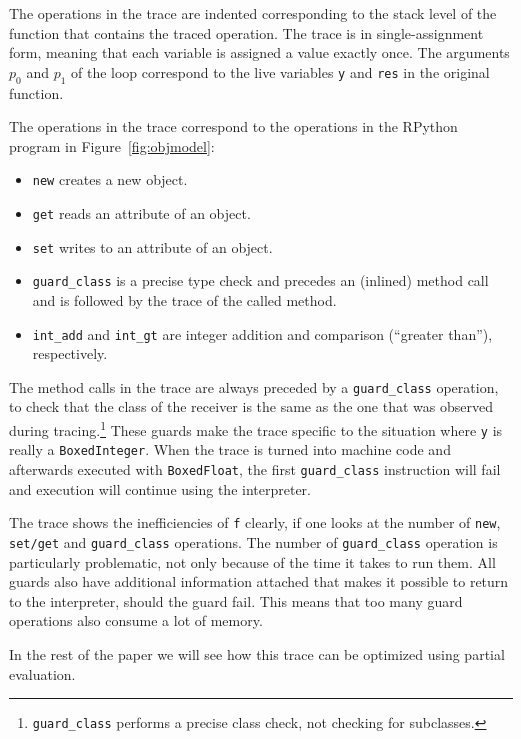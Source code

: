 \documentclass[preprint]{sigplanconf}
\begin{document}
The operations in the trace are indented
corresponding to the stack level of the function that contains the traced
operation. The trace is in single-assignment form, meaning that each variable is
assigned a value exactly once. The arguments $p_0$ and $p_1$ of the loop correspond
to the live variables \lstinline{y} and \lstinline{res} in the original function.

The operations in the trace correspond to the operations in the RPython program
in Figure~\ref{fig:objmodel}:

\begin{itemize}
    \item \lstinline{new} creates a new object.
    \item \lstinline{get} reads an attribute of an object.
    \item \lstinline{set} writes to an attribute of an object.
    \item \lstinline{guard_class} is a precise type check and precedes an
    (inlined) method call and is followed by the trace of the called method.
    \item \lstinline{int_add} and \lstinline{int_gt} are integer addition and
    comparison (``greater than''), respectively.
\end{itemize}

The method calls in the trace are always preceded by a \lstinline{guard_class}
operation, to check that the class of the receiver is the same as the one that
was observed during tracing.\footnote{\lstinline{guard_class} performs a precise
class check, not checking for subclasses.} These guards make the trace specific
to the situation where \lstinline{y} is really a \lstinline{BoxedInteger}. When
the trace is turned into machine code and afterwards executed with
\lstinline{BoxedFloat}, the
first \lstinline{guard_class} instruction will fail and execution will continue
using the interpreter.

The trace shows the inefficiencies of \lstinline{f} clearly, if one looks at
the number of \lstinline{new}, \lstinline{set/get} and \lstinline{guard_class}
operations. The number of \lstinline{guard_class} operation is particularly
problematic, not only because of the time it takes to run them. All guards also
have additional information attached that makes it possible to return to the
interpreter, should the guard fail. This means that too many guard operations also
consume a lot of memory.

In the rest of the paper we will see how this trace can be optimized using
partial evaluation.
\end{document}
